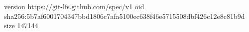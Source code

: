version https://git-lfs.github.com/spec/v1
oid sha256:5b7af6001704347bbd1806c7afa5100ec638f46e5715508dbf426c12e8c81b9d
size 147144
